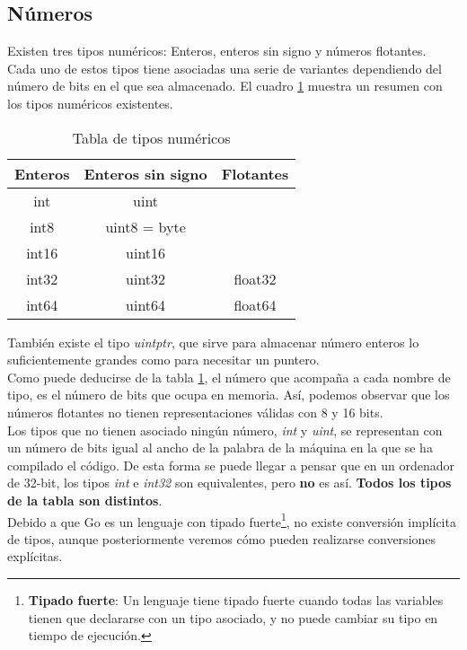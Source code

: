 	\subsection{Números}

	Existen tres tipos numéricos: Enteros, enteros sin signo y números
	flotantes.\\

	Cada uno de estos tipos tiene asociadas una serie de variantes dependiendo
	del número de bits en el que sea almacenado. El cuadro \ref{tiposnumericos}
	muestra un resumen con los tipos numéricos existentes.\\

	\begin{table}[htb]
		\begin{center}
			\begin{tabular}{ccc}
			\textbf{Enteros} & \textbf{Enteros sin signo} & \textbf{Flotantes}\\
			\hline
			int & uint & \\
			int8 & uint8 = byte & \\
			int16 & uint16 & \\
			int32 & uint32 & float32\\
			int64 & uint64 & float64
			\end{tabular}
		\end{center}
	\caption{Tabla de tipos numéricos}
	\label{tiposnumericos}
	\end{table}

	También existe el tipo \emph{uintptr}, que sirve para almacenar número
	enteros lo suficientemente grandes como para necesitar un puntero.\\

	Como puede deducirse de la tabla \ref{tiposnumericos}, el número que acompaña a cada
	nombre de tipo, es el número de bits que ocupa en memoria. Así, podemos
	observar que los números flotantes no tienen representaciones válidas con
	8 y 16 bits.\\

	Los tipos que no tienen asociado ningún número, \emph{int} y \emph{uint},
	se representan con un número de bits igual al ancho de la
	palabra de la máquina en la que se ha compilado el código. De esta forma se
	puede llegar a pensar que en un ordenador de 32-bit, los tipos \emph{int}
	e \emph{int32} son equivalentes, pero \textbf{no} es así. \textbf{Todos
	los tipos de la tabla son distintos}.\\

	Debido a que Go es un lenguaje con tipado fuerte\footnote{\textbf{Tipado
	fuerte}: Un lenguaje tiene tipado fuerte cuando todas las variables tienen
	que declararse con un tipo asociado, y no puede cambiar su tipo en tiempo de
	ejecución.}, no existe conversión implícita de tipos, aunque posteriormente
	veremos cómo pueden realizarse conversiones explícitas.

